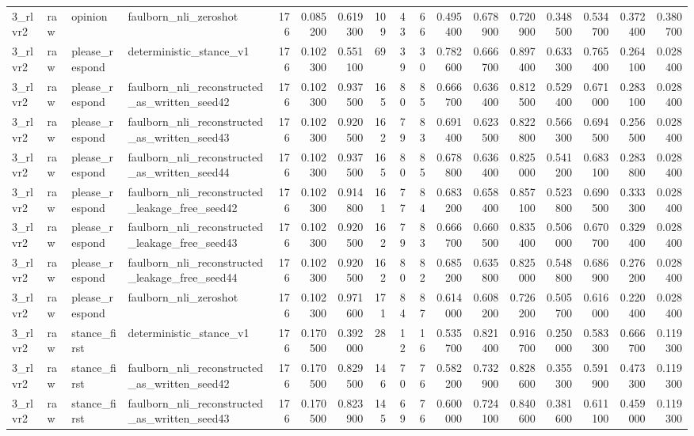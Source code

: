 \begin{tabular}{llllrrrrrrrrrrrrr}
3_rlvr2 & raw & opinion & faulborn_nli_zeroshot & 176 & 0.085200 & 0.619300 & 109 & 43 & 66 & 0.495400 & 0.678900 & 0.720900 & 0.348500 & 0.534700 & 0.372400 & 0.380700 \\
3_rlvr2 & raw & please_respond & deterministic_stance_v1 & 176 & 0.102300 & 0.551100 & 69 & 39 & 30 & 0.782600 & 0.666700 & 0.897400 & 0.633300 & 0.765400 & 0.264100 & 0.028400 \\
3_rlvr2 & raw & please_respond & faulborn_nli_reconstructed_as_written_seed42 & 176 & 0.102300 & 0.937500 & 165 & 80 & 85 & 0.666700 & 0.636400 & 0.812500 & 0.529400 & 0.671000 & 0.283100 & 0.028400 \\
3_rlvr2 & raw & please_respond & faulborn_nli_reconstructed_as_written_seed43 & 176 & 0.102300 & 0.920500 & 162 & 79 & 83 & 0.691400 & 0.623500 & 0.822800 & 0.566300 & 0.694500 & 0.256500 & 0.028400 \\
3_rlvr2 & raw & please_respond & faulborn_nli_reconstructed_as_written_seed44 & 176 & 0.102300 & 0.937500 & 165 & 80 & 85 & 0.678800 & 0.636400 & 0.825000 & 0.541200 & 0.683100 & 0.283800 & 0.028400 \\
3_rlvr2 & raw & please_respond & faulborn_nli_reconstructed_leakage_free_seed42 & 176 & 0.102300 & 0.914800 & 161 & 77 & 84 & 0.683200 & 0.658400 & 0.857100 & 0.523800 & 0.690500 & 0.333300 & 0.028400 \\
3_rlvr2 & raw & please_respond & faulborn_nli_reconstructed_leakage_free_seed43 & 176 & 0.102300 & 0.920500 & 162 & 79 & 83 & 0.666700 & 0.660500 & 0.835400 & 0.506000 & 0.670700 & 0.329400 & 0.028400 \\
3_rlvr2 & raw & please_respond & faulborn_nli_reconstructed_leakage_free_seed44 & 176 & 0.102300 & 0.920500 & 162 & 80 & 82 & 0.685200 & 0.635800 & 0.825000 & 0.548800 & 0.686900 & 0.276200 & 0.028400 \\
3_rlvr2 & raw & please_respond & faulborn_nli_zeroshot & 176 & 0.102300 & 0.971600 & 171 & 84 & 87 & 0.614000 & 0.608200 & 0.726200 & 0.505700 & 0.616000 & 0.220400 & 0.028400 \\
3_rlvr2 & raw & stance_first & deterministic_stance_v1 & 176 & 0.170500 & 0.392000 & 28 & 12 & 16 & 0.535700 & 0.821400 & 0.916700 & 0.250000 & 0.583300 & 0.666700 & 0.119300 \\
3_rlvr2 & raw & stance_first & faulborn_nli_reconstructed_as_written_seed42 & 176 & 0.170500 & 0.829500 & 146 & 70 & 76 & 0.582200 & 0.732900 & 0.828600 & 0.355300 & 0.591900 & 0.473300 & 0.119300 \\
3_rlvr2 & raw & stance_first & faulborn_nli_reconstructed_as_written_seed43 & 176 & 0.170500 & 0.823900 & 145 & 69 & 76 & 0.600000 & 0.724100 & 0.840600 & 0.381600 & 0.611100 & 0.459000 & 0.119300 \\

\end{tabular}

